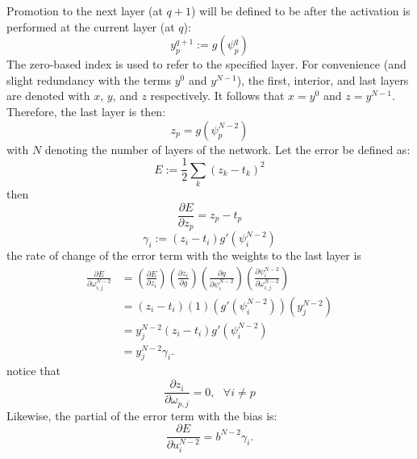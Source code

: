 \documentclass{article}
\begin{document}
Promotion to the next layer (at $q+1$) will be defined to be after the activation is performed at the current layer (at $q$):
%
\begin{equation} \label{eq:z}
y_p^{q+1} := g(\psi_p^q)
\end{equation}
%
The zero-based index is used to refer to the specified layer.
For convenience (and slight redundancy with the terms $y^0$ and $y^{N-1}$), the first, interior, and last layers are denoted with $x$, $y$, and $z$ respectively.
It follows that $x = y^0$ and $z = y^{N-1}$.
Therefore, the last layer is then:
%
\begin{equation} \label{eq:z}
z_p = g(\psi_p^{N-2})
\end{equation}
%
with $N$ denoting the number of layers of the network.
%
Let the error be defined as:
%
\begin{equation} \label{eq:error}
E := \frac{1}{2} \sum_k (z_k - t_k)^2
\end{equation}
%
then
%
\begin{equation} \label{eq:derror}
\frac{\partial E}{\partial z_p} = z_p - t_p
\end{equation}
%
\begin{equation} \label{eq:gamma}
\gamma_i := (z_i - t_i) g'(\psi_i^{N-2})
\end{equation}
%
the rate of change of the error term with the weights to the last layer is
%
\begin{equation} \label{eq:last_layer_derror}
\begin{aligned}
\frac{\partial E}{\partial \omega_{i,j}^{N-2}} &=
\left( \frac{\partial E}{\partial z_i} \right)
\left( \frac{\partial z_i}{\partial g} \right)
\left( \frac{\partial g}{\partial \psi_i^{N-2}} \right)
\left( \frac{\partial \psi_i^{N-2}}{\partial \omega_{i, j}^{N-2}} \right) \\
&=
\left( z_i - t_i \right)
\left( 1 \right)
\left( g' (\psi_i^{N-2}) \right)
\left( y_j^{N-2} \right) \\
&=
y_j^{N-2}
\left( z_i - t_i \right)
g' (\psi_i^{N-2}) \\
&=
y_j^{N-2}
\gamma_i.
\end{aligned}
\end{equation}
%
notice that
%
\begin{equation} \label{eq:last_layer_derror_eq_0}
\frac{\partial z_i}{\partial \omega_{p,j}} = 0, \ \ \ \forall i \neq p
\end{equation}
%
Likewise, the partial of the error term with the bias is:
%
\begin{equation} \label{eq:d_bias}
\frac{\partial E}{\partial u_{i}^{N-2}} =
b^{N-2}
\gamma_i.
\end{equation}
\end{document}
